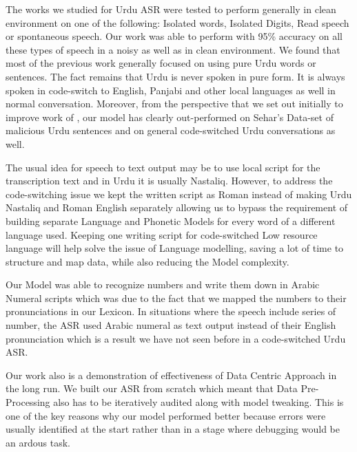 \documentclass{article}
\begin{document}
The works we studied for Urdu ASR were tested to perform generally in clean environment on one of the following: Isolated words, Isolated Digits, Read speech or spontaneous speech. Our work was able to perform with 95\% accuracy on all these types of speech in a noisy as well as in clean environment. We found that most of the previous work generally focused on using pure Urdu words or sentences. The fact remains that Urdu is never spoken in pure form. It is always spoken in code-switch to English, Panjabi and other local languages as well in normal conversation. Moreover, from the perspective that we set out initially to improve work of \cite{sehar_gul_detecting_2020}, our model has clearly out-performed on Sehar's Data-set of malicious Urdu sentences and on general code-switched Urdu conversations as well. 


The usual idea for speech to text output may be to use local script for the transcription text and in Urdu it is usually Nastaliq. However, to address the code-switching issue we kept the written script as Roman instead of making Urdu Nastaliq and Roman English separately allowing us to bypass the requirement of building separate Language and Phonetic Models for every word of a different language used. Keeping one writing script for code-switched Low resource language will help solve the issue of Language modelling, saving a lot of time to structure and map data, while also reducing the Model complexity. 

Our Model was able to recognize numbers and write them down in Arabic Numeral scripts which was due to the fact that we mapped the numbers to their pronunciations in our Lexicon. In situations where the speech include series of number, the ASR used Arabic numeral as text output instead of their English pronunciation which is a result we have not seen before in a code-switched Urdu ASR. 


Our work also is a demonstration of effectiveness of Data Centric Approach in the long run. We built our ASR from scratch which meant that Data Pre-Processing also has to be iteratively audited along with model tweaking. This is one of the key reasons why our model performed better because errors were usually identified at the start rather than in a stage where debugging would be an ardous task. 
\end{document}
